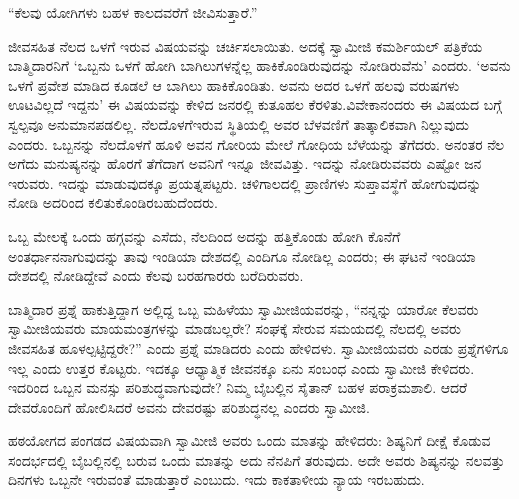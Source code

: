 \vskip 5pt

“ಕೆಲವು ಯೋಗಿಗಳು ಬಹಳ ಕಾಲದವರೆಗೆ ಜೀವಿಸುತ್ತಾರೆ.”

\vskip 5pt

ಜೀವಸಹಿತ ನೆಲದ ಒಳಗೆ ಇರುವ ವಿಷಯವನ್ನು ಚರ್ಚಿಸಲಾಯಿತು. ಅದಕ್ಕೆ ಸ್ವಾಮೀಜಿ ಕಮರ್ಶಿಯಲ್​ ಪತ್ರಿಕೆಯ ಬಾತ್ಮಿದಾರನಿಗೆ ‘ಒಬ್ಬನು ಒಳಗೆ ಹೋಗಿ ಬಾಗಿಲುಗಳನ್ನೆಲ್ಲ ಹಾಕಿಕೊಂಡಿರುವುದನ್ನು ನೋಡಿರುವೆನು’ ಎಂದರು. ‘ಅವನು ಒಳಗೆ ಪ್ರವೇಶ ಮಾಡಿದ ಕೂಡಲೆ ಆ ಬಾಗಿಲು ಹಾಕಿಕೊಂಡಿತು. ಅವನು ಅದರ ಒಳಗೆ ಹಲವು ವರುಷಗಳು ಊಟವಿಲ್ಲದೆ ಇದ್ದನು’ ಈ ವಿಷಯವನ್ನು ಕೇಳಿದ ಜನರಲ್ಲಿ ಕುತೂಹಲ ಕೆರಳಿತು.\break ವಿವೇಕಾನಂದರು ಈ ವಿಷಯದ ಬಗ್ಗೆ ಸ್ವಲ್ಪವೂ ಅನುಮಾನಪಡಲಿಲ್ಲ. ನೆಲದೊಳಗೆ\break ಇರುವ ಸ್ಥಿತಿಯಲ್ಲಿ ಅವರ ಬೆಳವಣಿಗೆ ತಾತ್ಕಾಲಿಕವಾಗಿ ನಿಲ್ಲುವುದು ಎಂದರು. ಒಬ್ಬನನ್ನು ನೆಲದೊಳಗೆ ಹೂಳಿ ಅವನ ಗೋರಿಯ ಮೇಲೆ ಗೋಧಿಯ ಬೆಳೆಯನ್ನು ತೆಗೆದರು. ಅನಂತರ ನೆಲ ಅಗೆದು ಮನುಷ್ಯನನ್ನು ಹೊರಗೆ ತೆಗೆದಾಗ ಅವನಿಗೆ ಇನ್ನೂ ಜೀವವಿತ್ತು. ಇದನ್ನು ನೋಡಿರುವವರು ಎಷ್ಟೋ ಜನ ಇರುವರು. ಇದನ್ನು ಮಾಡುವುದಕ್ಕೂ ಪ್ರಯತ್ನಪಟ್ಟರು. ಚಳಿಗಾಲದಲ್ಲಿ ಪ್ರಾಣಿಗಳು ಸುಪ್ತಾವಸ್ಥೆಗೆ ಹೋಗುವುದನ್ನು ನೋಡಿ ಅದರಿಂದ ಕಲಿತುಕೊಂಡಿರಬಹುದೆಂದರು.

\vskip 5pt

ಒಬ್ಬ ಮೇಲಕ್ಕೆ ಒಂದು ಹಗ್ಗವನ್ನು ಎಸೆದು, ನೆಲದಿಂದ ಅದನ್ನು ಹತ್ತಿಕೊಂಡು ಹೋಗಿ ಕೊನೆಗೆ ಅಂತರ್ಧಾನನಾಗುವುದನ್ನು ತಾವು ಇಂಡಿಯಾ ದೇಶದಲ್ಲಿ ಎಂದಿಗೂ ನೋಡಿಲ್ಲ ಎಂದರು; ಈ ಘಟನೆ ಇಂಡಿಯಾ ದೇಶದಲ್ಲಿ ನೋಡಿದ್ದೇವೆ ಎಂದು ಕೆಲವು ಬರಹಗಾರರು ಬರೆದಿರುವರು.

\vskip 5pt

ಬಾತ್ಮಿದಾರ ಪ್ರಶ್ನೆ ಹಾಕುತ್ತಿದ್ದಾಗ ಅಲ್ಲಿದ್ದ ಒಬ್ಬ ಮಹಿಳೆಯು ಸ್ವಾಮೀಜಿಯವರನ್ನು, “ನನ್ನನ್ನು ಯಾರೋ ಕೆಲವರು ಸ್ವಾಮೀಜಿಯವರು ಮಾಯಮಂತ್ರಗಳನ್ನು ಮಾಡಬಲ್ಲರೇ? ಸಂಘಕ್ಕೆ ಸೇರುವ ಸಮಯದಲ್ಲಿ ನೆಲದಲ್ಲಿ ಅವರು ಜೀವಸಹಿತ ಹೂಳಲ್ಪಟ್ಟಿದ್ದರೇ?” ಎಂದು ಪ್ರಶ್ನೆ ಮಾಡಿದರು ಎಂದು ಹೇಳಿದಳು. ಸ್ವಾಮೀಜಿಯವರು ಎರಡು ಪ್ರಶ್ನೆಗಳಿಗೂ ಇಲ್ಲ ಎಂದು ಉತ್ತರ ಕೊಟ್ಟರು. ಇದಕ್ಕೂ ಆಧ್ಯಾತ್ಮಿಕ ಜೀವನಕ್ಕೂ ಏನು ಸಂಬಂಧ ಎಂದು ಸ್ವಾಮೀಜಿ ಕೇಳಿದರು. ಇದರಿಂದ ಒಬ್ಬನ ಮನಸ್ಸು ಪರಿಶುದ್ಧವಾಗುವುದೇ? ನಿಮ್ಮ ಬೈಬಲ್ಲಿನ ಸೈತಾನ್​ ಬಹಳ ಪರಾಕ್ರಮಶಾಲಿ. ಆದರೆ ದೇವರೊಂದಿಗೆ ಹೋಲಿಸಿದರೆ ಅವನು ದೇವರಷ್ಟು ಪರಿಶುದ್ಧನಲ್ಲ ಎಂದರು ಸ್ವಾಮೀಜಿ.

\vskip 5pt

ಹಠಯೋಗದ ಪಂಗಡದ ವಿಷಯವಾಗಿ ಸ್ವಾಮೀಜಿ ಅವರು ಒಂದು ಮಾತನ್ನು ಹೇಳಿದರು: ಶಿಷ್ಯನಿಗೆ ದೀಕ್ಷೆ ಕೊಡುವ ಸಂದರ್ಭದಲ್ಲಿ ಬೈಬಲ್ಲಿನಲ್ಲಿ ಬರುವ ಒಂದು ಮಾತನ್ನು ಅದು ನೆನಪಿಗೆ ತರುವುದು. ಅದೇ ಅವರು ಶಿಷ್ಯನನ್ನು ನಲವತ್ತು ದಿನಗಳು ಒಬ್ಬನೇ ಇರುವಂತೆ ಮಾಡುತ್ತಾರೆ ಎಂಬುದು. ಇದು ಕಾಕತಾಳೀಯ ನ್ಯಾಯ ಇರಬಹುದು.

\vspace{-0.3cm}

